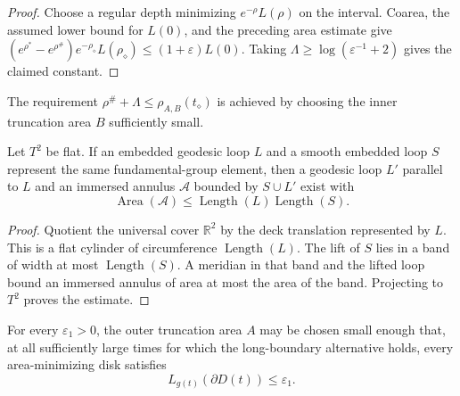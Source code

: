 \begin{proof}
\sketch
Choose a regular depth minimizing \(e^{-\rho}L(\rho)\) on the interval.  Coarea,
the assumed lower bound for \(L(0)\), and the preceding area estimate give
\((e^{\rho^*}-e^{\rho^\#})e^{-\rho_\diamond}L(\rho_\diamond)
\le(1+\varepsilon)L(0)\).  Taking
\(\Lambda\ge\log(\varepsilon^{-1}+2)\) gives the claimed constant.
\end{proof}

\begin{remark}
\label{rem:chow-iv-short-loop-depth-requirement}


The requirement \(\rho^\#+\Lambda\le\rho_{A,B}(t_\diamond)\) is achieved by
choosing the inner truncation area \(B\) sufficiently small.
\end{remark}

\begin{lemma}
\label{lem:chow-iv-flat-torus-annulus-area}

Let \(T^2\) be flat.  If an embedded geodesic loop \(L\) and a smooth embedded
loop \(S\) represent the same fundamental-group element, then a geodesic loop
\(L'\) parallel to \(L\) and an immersed annulus \(\mathcal A\) bounded by
\(S\cup L'\) exist with
\[
 \operatorname{Area}(\mathcal A)
 \le\operatorname{Length}(L)\operatorname{Length}(S).
\]
\end{lemma}

\begin{proof}
\sketch
Quotient the universal cover \(\mathbb R^2\) by the deck translation
represented by \(L\).  This is a flat cylinder of circumference
\(\operatorname{Length}(L)\).  The lift of \(S\) lies in a band of width at most
\(\operatorname{Length}(S)\).  A meridian in that band and the lifted loop
bound an immersed annulus of area at most the area of the band.  Projecting to
\(T^2\) proves the estimate.
\end{proof}

\begin{proposition}
\label{prop:chow-iv-minimizing-disk-boundary-small}


For every \(\varepsilon_1>0\), the outer truncation area \(A\) may be chosen
small enough that, at all sufficiently large times for which the long-boundary
alternative holds, every area-minimizing disk satisfies
\[
 L_{g(t)}(\partial D(t))\le\varepsilon_1.
\]
\end{proposition}

